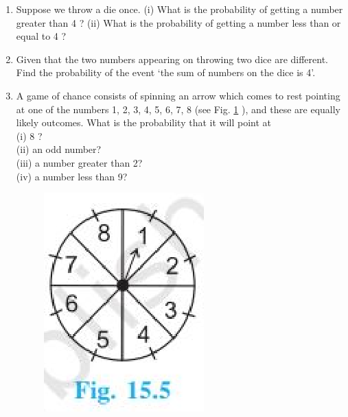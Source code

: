 \begin{enumerate}[label=\thesection.\arabic*.,ref=\thesection.\theenumi]
\item Suppose we throw a die once. (i) What is the probability of getting a number greater than 4 ? (ii) What is the probability of getting a number less than or
equal to 4 ?
\\
\solution

\item  Given that the two numbers appearing on throwing two dice are different. Find the probability of the event `the sum of numbers on the dice is 4'.\\
\solution

\item A game of chance consists of spinning an arrow which comes to rest pointing at one of the numbers 1, 2, 3, 4, 5, 6, 7, 8 (see Fig. \ref{fig:122} ), and these are equally likely outcomes. What is the probability that it will point at\\
(i) 8 ?\\
(ii) an odd number?\\
(iii) a number greater than 2?\\
(iv) a number less than 9?\\
\begin{figure}[!ht]
\centering
\includegraphics[width=\columnwidth]{./prob/figs/clock.eps}
\caption{}
\label{fig:122}
\end{figure}
\\
\solution

\end{enumerate}


